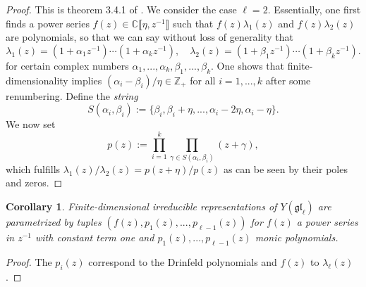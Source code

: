 \documentclass[11pt]{report}
\newtheorem{corollary}[theorem]{Corollary}
\theoremstyle{definition}
\theoremstyle{remark}
\theoremstyle{remark}
\newcommand{\Z}{\mathbb{Z}}
\newcommand{\C}{\mathbb{C}}
\begin{document}
\begin{proof}
This is theorem 3.4.1 of \cite{book:molev}. We consider the case $\ell = 2$. Essentially, one first finds a power series $f(z) \in \C\llbracket \eta,z^{-1} \rrbracket$ such that $f(z) \lambda_1(z)$ and $f(z) \lambda_2(z)$ are polynomials, so that we can say without loss of generality that
\begin{equation*}
\lambda_1(z) = (1+\alpha_1 z^{-1}) \cdots (1+\alpha_k z^{-1}), \quad \lambda_2(z) = (1+\beta_1 z^{-1}) \cdots (1+\beta_k z^{-1}).
\end{equation*}
for certain complex numbers $\alpha_1,...,\alpha_k,\beta_1,...,\beta_k$. One shows that finite-dimensionality implies $(\alpha_i - \beta_i)/\eta \in \Z_+$ for all $i=1,...,k$ after some renumbering. Define the \emph{string}
\begin{equation*}
S(\alpha_i,\beta_i) := \{ \beta_i, \beta_i+\eta, ..., \alpha_i-2\eta, \alpha_i-\eta \}.
\end{equation*}
We now set
\begin{equation*}
p(z) := \prod_{i=1}^k \prod_{\gamma \in S(\alpha_i,\beta_i)} (z + \gamma),
\end{equation*}
which fulfills $\lambda_1(z) / \lambda_2(z) = p(z+\eta) / p(z)$ as can be seen by their poles and zeros.
\end{proof}

\begin{corollary}
Finite-dimensional irreducible representations of $Y(\mathfrak{gl}_\ell)$ are parametrized by tuples $(f(z),p_1(z),...,p_{\ell-1}(z))$ for $f(z)$ a power series in $z^{-1}$ with constant term one and $p_1(z),...,p_{\ell-1}(z)$ monic polynomials.
\end{corollary}

\begin{proof}
The $p_i(z)$ correspond to the Drinfeld polynomials and $f(z)$ to $\lambda_\ell(z)$.
\end{proof}
\end{document}

